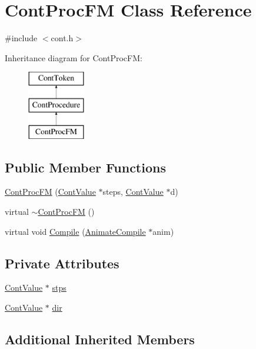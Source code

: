 \hypertarget{a00070}{\section{Cont\-Proc\-F\-M Class Reference}
\label{a00070}
}


{\ttfamily \#include $<$cont.\-h$>$}

Inheritance diagram for Cont\-Proc\-F\-M\-:\begin{figure}[H]
\begin{center}
\leavevmode
\includegraphics[height=3.000000cm]{a00070}
\end{center}
\end{figure}
\subsection*{Public Member Functions}
\begin{DoxyCompactItemize}
\item 
\hyperlink{a00070_abff5e5744bc965d792aae3c410c33e77}{Cont\-Proc\-F\-M} (\hyperlink{a00086}{Cont\-Value} $\ast$steps, \hyperlink{a00086}{Cont\-Value} $\ast$d)
\item 
virtual \hyperlink{a00070_a208c5853dba2562b250db21bc81e21b6}{$\sim$\-Cont\-Proc\-F\-M} ()
\item 
virtual void \hyperlink{a00070_afa13e90ef92926d841f8ccde4ffc28a6}{Compile} (\hyperlink{a00007}{Animate\-Compile} $\ast$anim)
\end{DoxyCompactItemize}
\subsection*{Private Attributes}
\begin{DoxyCompactItemize}
\item 
\hyperlink{a00086}{Cont\-Value} $\ast$ \hyperlink{a00070_aeb044fa5c2acb27c72c017fcd41d09ce}{stps}
\item 
\hyperlink{a00086}{Cont\-Value} $\ast$ \hyperlink{a00070_a2a5343eff6f4bb803adf4adb9e222e12}{dir}
\end{DoxyCompactItemize}
\subsection*{Additional Inherited Members}


